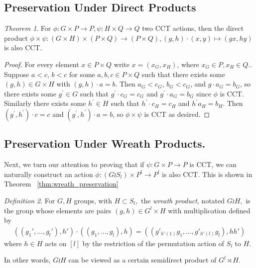 \documentclass[10 pt]{amsart}
\theoremstyle{plain}
\theoremstyle{definition}
\theoremstyle{remark}
\numberwithin{equation}{section}
\newtheorem{thm}{Theorem}[section]
\theoremstyle{remark}
\newtheorem{defn}[thm]{Definition}
\newcommand\ssec{\subsection}
\begin{document}

\iffalse
\ssec{Preservation Under Direct Products}
\label{ssec:direct_product_preservation}




\begin{thm}
\label{thm:direct_product_preservation}
For $\phi:G\times P\rightarrow P,\psi:H \times Q \rightarrow Q$ two CCT actions, then the direct product $\phi \times \psi:(G\times H)\times (P\times Q) \rightarrow (P\times Q),(g,h)\cdot (x,y) \mapsto (gx,hy)$ is also CCT.
\end{thm}
\begin{proof}
For every element $x\in P\times Q$ write $x = (x_G,x_H)$, where $x_G \in P, x_H \in Q.$. Suppose $a < c$, $b < c$ for some $a,b,c\in P\times Q$ such that there exists some $(g,h)\in G\times H$ with $(g,h)\cdot a = b$. Then $a_G < c_G$, $b_G < c_G$, and $g\cdot a_G = b_G$, so there exists some $g^\prime \in G$ such that $g^\prime\cdot c_G = c_G$ and $g^\prime\cdot a_G = b_G$ since $\phi$ is CCT.  Similarly there exists some $h^\prime \in H$ such that $h^\prime \cdot c_H = c_H$ and $h^\prime a_H = b_H$.  Then $(g^\prime,h^\prime)\cdot c = c$ and $(g^\prime,h^\prime)\cdot a = b$, so $\phi\times \psi$ is CCT as desired.
\end{proof}
\ssec{Preservation Under Wreath Products.}
\label{ssec:wreath_preservation}

Next, we turn our attention to proving that if $\psi:G \times P \rightarrow P$ is CCT, we can naturally construct an action $\phi:(G\wr S_l)\times P^l \rightarrow P^l$ is also CCT. This is shown in Theorem ~\ref{thm:wreath_preservation}

\begin{defn}
For $G, H$ groups, with $H \subset S_l,$ the {\it wreath product}, notated $G \wr H,$ is the group whose elements are pairs $(g,h) \in G^l\times H$ with multiplication defined by
\begin{align*}
((g_1',\ldots, g_l'),h') \cdot ((g_1,\ldots, g_l) ,h) =((g'_{h'(1)}g_1,\ldots, g'_{h'(l)}g_l),hh')
\end{align*}
where $h \in H$ acts on $[l]$ by the restriction of the permutation action of $S_l$ to $H.$
\end{defn}

In other words, $G\wr H$ can be viewed as a certain semidirect product of $G^l \rtimes H.$
\end{document}
